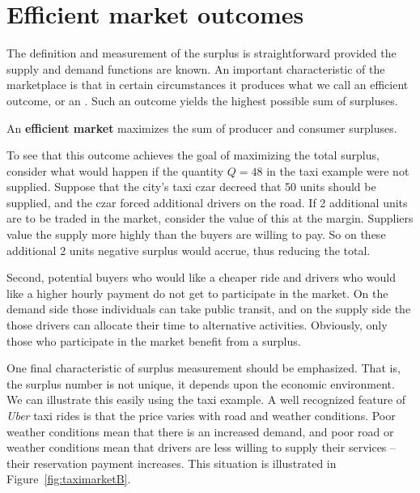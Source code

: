 \section{Efficient market outcomes}\label{sec:ch5sec3}

The definition and measurement of the surplus is straightforward
provided the supply and demand functions are known. An important
characteristic of the marketplace is that in certain circumstances it
produces what we call an efficient outcome, or an . Such an outcome yields the highest possible sum of surpluses. 

\begin{DefBox}
An \textbf{efficient market} maximizes the sum of producer and consumer surpluses.
\end{DefBox}

To see that this outcome achieves the goal of maximizing the total surplus,
consider what would happen if the quantity $Q=48$ in the taxi example were not supplied. Suppose
that the city's taxi czar decreed that 50 units should be supplied, and
the czar forced additional drivers on the road. If 2 additional units are
to be traded in the market, consider the value of this at the margin.
Suppliers value the supply more highly than the buyers are willing to pay.
So on these additional 2 units negative surplus would accrue, thus
reducing the total.

Second, potential buyers who would like a cheaper ride and drivers who would
like a higher hourly payment do not get to participate in the market. On the
demand side those individuals can take public transit, and on the supply
side the those drivers can allocate their time to alternative activities.
Obviously, only those who participate in the market benefit from a surplus.

\newhtmlpage

One final characteristic of surplus measurement should be emphasized. That
is, the surplus number is not unique, it depends upon the economic
environment. We can illustrate this easily using the taxi example. A well
recognized feature of \textit{Uber} taxi rides is that the price varies with road and
weather conditions. Poor weather conditions mean that there is an increased
demand, and poor road or weather conditions mean that drivers are less
willing to supply their services -- their reservation payment increases. This
situation is illustrated in Figure~\ref{fig:taximarketB}. 



